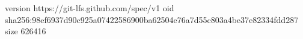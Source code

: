 version https://git-lfs.github.com/spec/v1
oid sha256:98ef6937d90c925a07422586900ba62504e76a7d55c803a4be37e82334fdd287
size 626416
